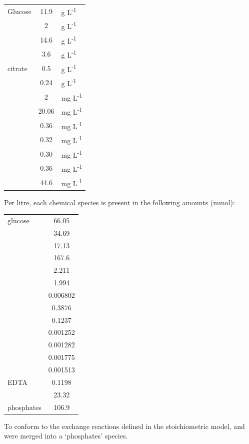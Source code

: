 \documentclass[parskip=full]{scrreprt}
\begin{document}
\begin{tabular}{lSl}
  Glucose & 11.9 & g L\textsuperscript{-1}\\
   & 2 & g L\textsuperscript{-1}\\
   & 14.6 & g L\textsuperscript{-1}\\
   & 3.6 & g L\textsuperscript{-1}\\
   citrate & 0.5 & g L\textsuperscript{-1}\\
   & 0.24 & g L\textsuperscript{-1}\\
   & 2 & mg L\textsuperscript{-1}\\
   & 20.06 & mg L\textsuperscript{-1}\\
   & 0.36 & mg L\textsuperscript{-1}\\
   & 0.32 & mg L\textsuperscript{-1}\\
   & 0.30 & mg L\textsuperscript{-1}\\
   & 0.36 & mg L\textsuperscript{-1}\\
   & 44.6 & mg L\textsuperscript{-1}
\end{tabular}

Per litre, each chemical species is present in the following amounts (mmol):

\begin{tabular}{lS}
  glucose & 66.05\\
   & 34.69\\
   & 17.13\\
   & 167.6\\
   & 2.211\\
   & 1.994\\
   & 0.006802\\
   & 0.3876\\
   & 0.1237\\
   & 0.001252\\
   & 0.001282\\
   & 0.001775\\
   & 0.001513\\
  EDTA & 0.1198\\
   & 23.32\\
  phosphates & 106.9
\end{tabular}

To conform to the exchange reactions defined in the stoichiometric model,  and  were merged into a `phosphates' species.
\end{document}
